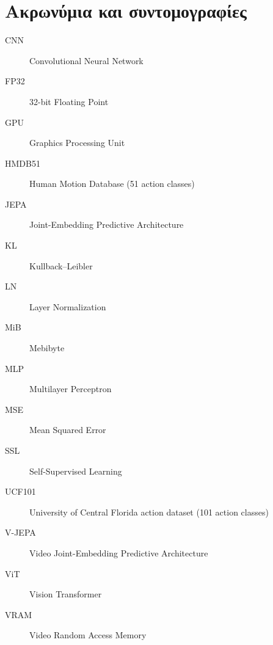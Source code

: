 \chapter{Ακρωνύμια και συντομογραφίες}

\begin{description}
  \item[CNN] Convolutional Neural Network
  \item[FP32] 32-bit Floating Point
  \item[GPU] Graphics Processing Unit
  \item[HMDB51] Human Motion Database (51 action classes)
  \item[JEPA] Joint-Embedding Predictive Architecture
  \item[KL] Kullback--Leibler
  \item[LN] Layer Normalization
  \item[MiB] Mebibyte
  \item[MLP] Multilayer Perceptron
  \item[MSE] Mean Squared Error
  \item[SSL] Self-Supervised Learning
  \item[UCF101] University of Central Florida action dataset (101 action classes)
  \item[V-JEPA] Video Joint-Embedding Predictive Architecture
  \item[ViT] Vision Transformer
  \item[VRAM] Video Random Access Memory
\end{description}
